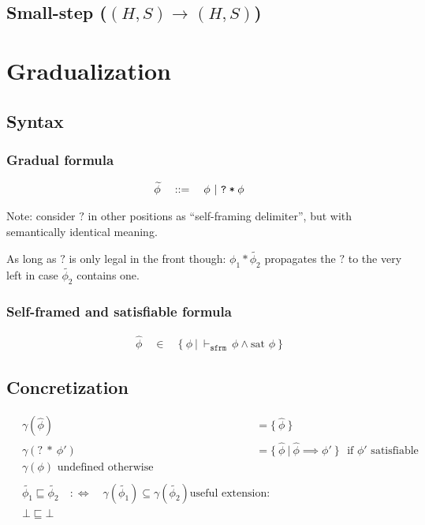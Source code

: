\documentclass[11pt,a4paper]{article}
\newcommand{\ttt}{\texttt}
\newcommand{\sfrmphi}{\ensuremath{\vdash_\texttt{sfrm}}\,}
\newcommand{\sstepGeneric}[5]{({#1}, {#2}) \rightarrow^{#3} ({#4}, {#5})}
\newcommand{\sstep}[4]{\sstepGeneric {#1} {#2} {} {#3} {#4}}
\newcommand{\grad}[1]{\widetilde{#1}}
\newcommand{\qm}{\ttt{?}}
\newcommand{\withqm}[1]{\ttt{\qm\:*\:$#1$}}
\begin{document}
\subsection{Small-step ($\sstep H S H S$)}


\section{Gradualization}
\subsection{Syntax}
\subsubsection{Gradual formula}
\begin{align*}
&\grad{\phi} \quad ::= \quad \phi ~|~ \withqm{\phi}
\end{align*}

Note: consider $?$ in other positions as ``self-framing delimiter'', but with semantically identical meaning.

As long as $?$ is only legal in the front though: $\phi_1 * \grad{\phi_2}$ propagates the $?$ to the very left in case $\grad{\phi_2}$ contains one.

\subsubsection{Self-framed and satisfiable formula}
\begin{align*}
&\hat{\phi} \quad \in \quad \{~ \phi ~|~ \sfrmphi \phi \wedge \text{sat~} \phi ~\}
\end{align*}

\subsection{Concretization}
\begin{align*}
&\gamma(\hat{\phi}) ~&&= \{~ \hat{\phi} ~\} \\
&\gamma(?\:*\:\phi') ~&&= \{~ \hat{\phi} ~|~ \hat{\phi} \implies \phi' ~\} \text{~~if $\phi'$ satisfiable} \\
&\gamma(\phi) \text{ undefined otherwise} \\
~\\
&\grad{\phi_1} \sqsubseteq \grad{\phi_2} \quad:\iff\quad \gamma(\grad{\phi_1}) \subseteq \gamma(\grad{\phi_2})
\text{useful extension:}\\
&\bot \sqsubseteq \bot
\end{align*}
\end{document}
